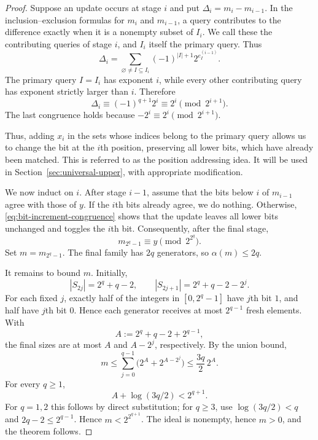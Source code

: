 \documentclass[11pt]{article}
\theoremstyle{definition}
\theoremstyle{remark}
\begin{document}
\begin{proof}
Suppose an update occurs at stage $i$ and put
$\Delta_i=m_i-m_{i-1}$. In the inclusion--exclusion formulas for $m_i$ and
$m_{i-1}$, a query contributes to the difference exactly when it is a
nonempty subset of $I_i$. We call these the contributing queries of stage
$i$, and $I_i$ itself the primary query. Thus
\begin{equation}
  \Delta_i=
  \sum_{\varnothing\ne I\subseteq I_i}
  (-1)^{|I|+1}
  2^{e_I^{(i-1)}}.
  \label{eq:bit-increment}
\end{equation}
The primary query $I=I_i$ has exponent $i$, while every other contributing query has exponent
strictly larger than $i$. Therefore
\begin{equation}
  \Delta_i\equiv(-1)^{q+1}2^i\equiv2^i
  \pmod{2^{i+1}}.
  \label{eq:bit-increment-congruence}
\end{equation}
The last congruence holds because $-2^i\equiv2^i\pmod{2^{i+1}}$.


Thus, adding $x_i$ in the sets whose indices belong to the primary query allows us to change the bit at the $i$th position, preserving all lower bits, which have already been matched. This is referred to as the position addressing idea. It will be used in Section~\ref{sec:universal-upper}, with appropriate modification. 

We now induct on $i$. After stage $i-1$, assume that the bits below $i$ of
$m_{i-1}$ agree with those of $y$. If the $i$th bits already agree, we do
nothing. Otherwise, \eqref{eq:bit-increment-congruence} shows that the update
leaves all lower bits unchanged and toggles the $i$th bit. Consequently,
after the final stage,
\[
  m_{2^q-1}\equiv y\pmod{2^{2^q}}.
\]
Set $m=m_{2^q-1}$. The final family has $2q$ generators, so
$\alpha(m)\le2q$.

It remains to bound $m$. Initially,
\[
  |S_{2j}|=2^q+q-2,
  \qquad
  |S_{2j+1}|=2^q+q-2-2^j.
\]
For each fixed $j$, exactly half of the integers in $[0,2^q-1]$ have $j$th
bit $1$, and half have $j$th bit $0$. Hence each generator receives at most
$2^{q-1}$ fresh elements. With
\[
  A:=2^q+q-2+2^{q-1},
\]
the final sizes are at most $A$ and $A-2^j$, respectively. By the union
bound,
\[
  m\le\sum_{j=0}^{q-1}\bigl(2^A+2^{A-2^j}\bigr)
  \le\frac{3q}{2}\,2^A.
\]
For every $q\ge1$,
\[
  A+\log(3q/2)<2^{q+1}.
\]
For $q=1,2$ this follows by direct substitution; for $q\ge3$, use
$\log(3q/2)<q$ and $2q-2\le2^{q-1}$. Hence $m<2^{2^{q+1}}$. The ideal is nonempty, hence $m>0$, and the theorem
follows.
\end{proof}
\end{document}
